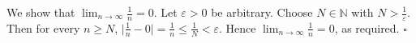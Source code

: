 We show that $\lim_{n \to \infty} \frac{1}{n} = 0$.
Let $\varepsilon > 0$ be arbitrary.
Choose $N \in \mathbb{N}$ with $N > \frac{1}{\varepsilon}$.
Then for every $n \geq N$, $\lvert \frac{1}{n} - 0 \rvert = \frac{1}{n} \leq \frac{1}{N} < \varepsilon$.
Hence $\lim_{n \to \infty} \frac{1}{n} = 0$, as required. \hfill$\square$